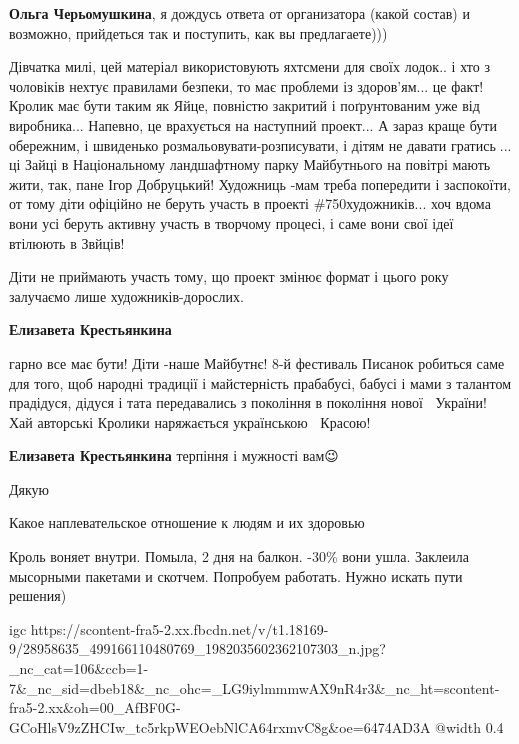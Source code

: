 \textbf{Ольга Черьомушкина}, я дождусь ответа от организатора (какой состав) и возможно, прийдеться так и поступить, как вы предлагаете)))


Дівчатка милі, цей матеріал використовують яхтсмени для своїх лодок.. і хто з
чоловіків нехтує правилами безпеки, то має проблеми із здоров'ям... це факт!
Кролик має бути таким як Яйце, повністю закритий і поґрунтованим уже від
виробника... Напевно, це врахується на наступний проект... А зараз краще бути
обережним, і швиденько розмальовувати-розписувати, і дітям не давати
гратись🐰... ці Зайці в Національному ландшафтному парку Майбутнього на повітрі
мають жити, так, пане Ігор Добруцький! Художниць -мам треба попередити і
заспокоїти, от тому діти офіційно не беруть участь в проекті \#750художників...
хоч вдома вони усі беруть активну участь в творчому процесі, і саме вони свої
ідеї втілюють в Звйців!

\begin{itemize} %

Діти не приймають участь тому, що проект змінює формат і цього року залучаємо лише художників-дорослих.

\textbf{Елизавета Крестьянкина} 

гарно все має бути! Діти -наше Майбутнє! 8-й фестиваль Писанок робиться саме
для того, щоб народні традиції і майстерність прабабусі, бабусі і мами з
талантом прадідуся, дідуся і тата передавались з покоління в покоління нової
💛💙України! Хай авторські Кролики наряжається українською 💛💙Красою!

\textbf{Елизавета Крестьянкина} терпіння і мужності вам😉

Дякую💞💞💞
\end{itemize} %


Какое наплевательское отношение к людям и их здоровью


Кроль воняет внутри. Помыла, 2 дня на балкон. -30\% вони ушла. Заклеила
мысорными пакетами и скотчем. Попробуем работать. Нужно искать пути решения)

\ifcmt
  igc https://scontent-fra5-2.xx.fbcdn.net/v/t1.18169-9/28958635_499166110480769_1982035602362107303_n.jpg?_nc_cat=106&ccb=1-7&_nc_sid=dbeb18&_nc_ohc=_LG9iylmmmwAX9nR4r3&_nc_ht=scontent-fra5-2.xx&oh=00_AfBF0G-GCoHlsV9zZHCIw_tc5rkpWEOebNlCA64rxmvC8g&oe=6474AD3A
	@width 0.4
\fi

